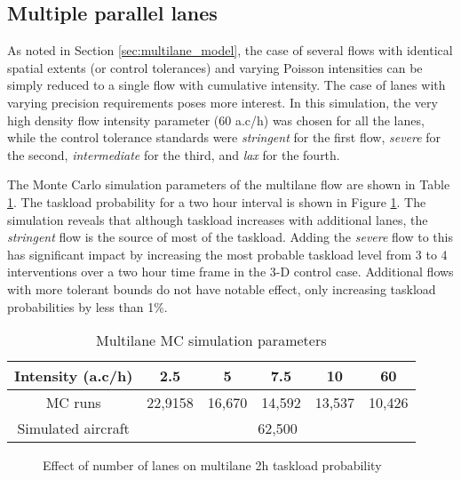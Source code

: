 \documentclass[conference]{IEEEtran}
\begin{document}
\subsection{Multiple parallel lanes}

As noted in Section \ref{sec:multilane_model}, the case of several flows with identical spatial extents (or control tolerances) and varying Poisson intensities can be simply reduced to a single flow with cumulative intensity. The case of lanes with varying precision requirements poses more interest. In this simulation, the very high density flow intensity parameter (60 a.c/h) was chosen for all the lanes, while the control tolerance standards were \emph{stringent} for the first flow, \emph{severe} for the second, \emph{intermediate} for the third, and \emph{lax} for the fourth.

The Monte Carlo simulation parameters of the multilane flow are shown in Table \ref{tab:multiflow_MC}. The taskload probability for a two hour interval is shown in Figure \ref{fig:task_lat_multifl}. The simulation reveals that although taskload increases with additional lanes, the \emph{stringent} flow is the source of most of the taskload. Adding the \emph{severe} flow to this has significant impact by increasing the most probable taskload level from 3 to 4 interventions over a two hour time frame in the 3-D control case. Additional flows with more tolerant bounds do not have notable effect, only increasing taskload probabilities by less than 1\%.

\begin{table}
\caption{Multilane MC simulation parameters}
\label{tab:multiflow_MC}
\centering
\begin{tabular}{|c|c|c|c|c|c|}
\hline\hline
Intensity  (a.c/h)&  2.5 & 5 & 7.5 & 10 & 60 \bigstrut\\ \hline
MC runs& 22,9158 & 16,670 & 14,592 & 13,537 & 10,426 \bigstrut \\ \hline
Simulated aircraft & \multicolumn{5}{c|}{62,500} \bigstrut\\ \hline\hline
\end{tabular}
\end{table}



\begin{figure}[!h]
\centering
{}
\caption{Effect of number of lanes on multilane 2h taskload probability}
\label{fig:task_lat_multifl}
\end{figure}
\end{document}

